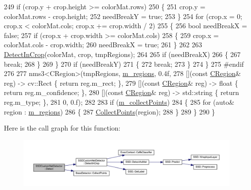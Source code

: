 \begin{DoxyCode}
249         \textcolor{keywordflow}{if} (crop.y + crop.height >= colorMat.rows)
250         \{
251             crop.y = colorMat.rows - crop.height;
252             needBreakY = \textcolor{keyword}{true};
253         \}
254         \textcolor{keywordflow}{for} (crop.x = 0; crop.x < colorMat.cols; crop.x += crop.width / 2)
255         \{
256             \textcolor{keywordtype}{bool} needBreakX = \textcolor{keyword}{false};
257             \textcolor{keywordflow}{if} (crop.x + crop.width >= colorMat.cols)
258             \{
259                 crop.x = colorMat.cols - crop.width;
260                 needBreakX = \textcolor{keyword}{true};
261             \}
262 
263             \mbox{\hyperlink{class_s_s_d_custom_net_detector_a9e87debb1ee3634724914830d6c2079d}{DetectInCrop}}(colorMat, crop, tmpRegions);
264 
265             \textcolor{keywordflow}{if} (needBreakX)
266             \{
267                 \textcolor{keywordflow}{break};
268             \}
269         \}
270         \textcolor{keywordflow}{if} (needBreakY)
271         \{
272             \textcolor{keywordflow}{break};
273         \}
274     \}
275 \textcolor{preprocessor}{#endif}
276 
277     nms3<CRegion>(tmpRegions, \mbox{\hyperlink{class_base_detector_a409c20093acba261db8354ca72058fce}{m\_regions}}, 0.4f,
278         [](\textcolor{keyword}{const} \mbox{\hyperlink{class_c_region}{CRegion}}& reg) -> cv::Rect \{ \textcolor{keywordflow}{return} reg.m\_rect; \},
279         [](\textcolor{keyword}{const} \mbox{\hyperlink{class_c_region}{CRegion}}& reg) -> \textcolor{keywordtype}{float} \{ \textcolor{keywordflow}{return} reg.m\_confidence; \},
280         [](\textcolor{keyword}{const} \mbox{\hyperlink{class_c_region}{CRegion}}& reg) -> std::string \{ \textcolor{keywordflow}{return} reg.m\_type; \},
281         0, 0.f);
282 
283     \textcolor{keywordflow}{if} (\mbox{\hyperlink{class_base_detector_a403cbf784fcb960bdb7d080c86c4a2ea}{m\_collectPoints}})
284     \{
285         \textcolor{keywordflow}{for} (\textcolor{keyword}{auto}& region : \mbox{\hyperlink{class_base_detector_a409c20093acba261db8354ca72058fce}{m\_regions}})
286         \{
287             \mbox{\hyperlink{class_base_detector_a20380b0980c6f262b0829f37fb89d2a7}{CollectPoints}}(region);
288         \}
289     \}
290 \}
\end{DoxyCode}
Here is the call graph for this function\+:\nopagebreak
\begin{figure}[H]
\begin{center}
\leavevmode
\includegraphics[width=350pt]{class_s_s_d_custom_net_detector_abcd14fa695e46fab1eab8ea5524c0ba5_cgraph}
\end{center}
\end{figure}
